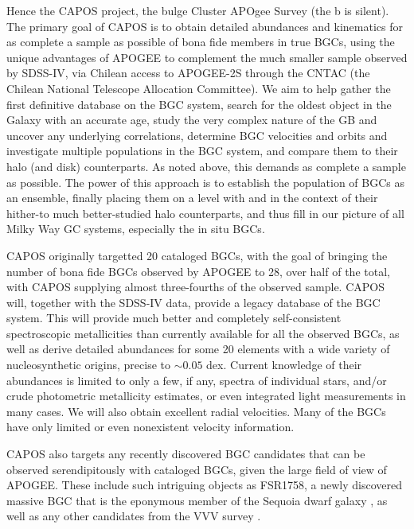 \documentclass[onecolumn]{aa}
\begin{document}
Hence the CAPOS project, the bulge Cluster APOgee Survey (the b is silent). 
The primary goal of CAPOS is to obtain detailed abundances and kinematics for as complete a sample as possible of bona fide members in true BGCs,  using the unique advantages of APOGEE to complement the much smaller sample observed by SDSS-IV, via Chilean access to APOGEE-2S through the CNTAC (the Chilean National Telescope Allocation Committee).
We aim to help gather the first definitive database on the BGC system, search for
the oldest object in the Galaxy with an accurate age, study the very complex nature of the GB and uncover any underlying correlations, determine BGC velocities and orbits and investigate multiple populations in the BGC system, and compare them to their halo (and disk) counterparts. As noted above, this demands as complete a  sample as possible. The power of this approach is to establish the population of BGCs as an ensemble, finally placing them on a level with and in the context of their hither-to much better-studied halo counterparts, and thus fill in our picture of all Milky Way GC systems, especially the in situ BGCs.

CAPOS originally targetted 20 cataloged BGCs, with the goal of bringing the number of bona fide BGCs observed by APOGEE to 28, over half of the total, with CAPOS supplying almost three-fourths of the observed sample. CAPOS will, together with the SDSS-IV data, provide a legacy database of the  BGC system. This will provide much better and completely self-consistent spectroscopic metallicities than currently available for all the observed BGCs, as well as derive detailed abundances for some 20 elements with a wide variety of nucleosynthetic origins, precise to $\sim 0.05$ dex. Current knowledge of their abundances is limited to only a few, if any, spectra of individual stars, and/or crude photometric metallicity estimates, or even integrated light measurements in many cases. We will
also obtain excellent radial velocities. Many of the BGCs have only limited or even nonexistent velocity information.

CAPOS also targets any recently discovered BGC candidates that can be observed serendipitously  with cataloged BGCs, given the large field of view of APOGEE. These include such intriguing objects as FSR1758, a newly discovered massive BGC that is the eponymous member of the Sequoia dwarf galaxy  \citep{Barba2019, Massari2019, Myeong2019, Villanova2019, Romero-Colmenares2021}, as well as any other candidates from the VVV survey \citep[e.g.,][]{Palma2019}.
\end{document}
